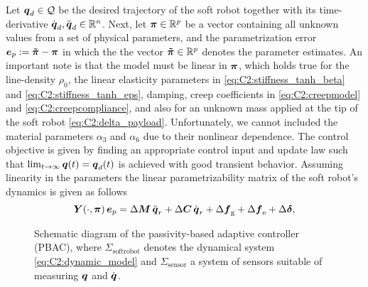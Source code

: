 Let ${\boldsymbol{q}}_d \in \mathcal{Q}$ be the desired trajectory of the soft robot together with its time-derivative ${\dot{\boldsymbol{q}}}_d,{\ddot{\boldsymbol{q}}}_d \in {\mathbb{R}^n}$. Next, let $\boldsymbol{\pi} \in \mathbb{R}^p$ be a vector containing all unknown values from a set of physical parameters, and the parametrization error $\boldsymbol{e}_{p} := \boldsymbol{\tilde{\boldsymbol{\pi}}} - \boldsymbol{\pi}$ in which the the vector $\boldsymbol{\tilde{\pi}} \in \mathbb{R}^p$ denotes the parameter estimates.  An important note is that the model must be linear in $\boldsymbol{\pi}$, which holds true for the line-density $\rho_0$, the linear elasticity parameters in \eqref{eq:C2:stiffness_tanh_beta} and \eqref{eq:C2:stiffness_tanh_eps}, damping, creep coefficients in \eqref{eq:C2:creepmodel} and \eqref{eq:C2:creepcompliance}, and also for an unknown mass applied at the tip of the soft robot \eqref{eq:C2:delta_payload}. Unfortunately, we cannot included the material parameters $\alpha_3$  and $\alpha_6$ due to their nonlinear dependence. The control objective is given by finding an appropriate control input and update law such that $\lim_{t\to \infty} {\boldsymbol{q}}(t) = {\boldsymbol{q}}_d(t)$ is achieved with good transient behavior. Assuming linearity in the parameters
the linear parametrizability matrix of the soft robot's dynamics is given as follows
%
\begin{equation}
\boldsymbol{Y}(\cdot,\boldsymbol{\pi})\,{\boldsymbol{e}_p} = \Delta \boldsymbol{M}\,{\ddot{\boldsymbol{q}}}_r + \Delta \boldsymbol{C}\,{\dot{\boldsymbol{q}}}_r + \Delta \boldsymbol{f}_{\scriptstyle\textrm{g}} +  \Delta\boldsymbol{f}_{\scriptstyle\textrm{e}} +  \Delta \boldsymbol{\delta},\label{eq:regress}
\end{equation}
%

\begin{figure}[!t]
    \vspace{-0.6mm}
    \centering
    
    \caption{\small Schematic diagram of the passivity-based adaptive controller (PBAC), where $\Sigma_{\textrm{softrobot}}$ denotes the dynamical system \eqref{eq:C2:dynamic_model} and $\Sigma_{\textrm{sensor}}$ a system of sensors suitable of measuring ${\boldsymbol{q}}$ and ${\dot{\boldsymbol{q}}}$. }
    \label{fig:C2:PBA_diagram}
  \end{figure}


